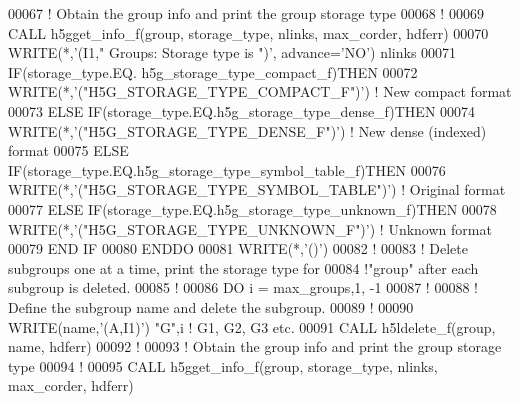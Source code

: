 \begin{DoxyCode}
00067      \textcolor{comment}{! Obtain the group info and print the group storage type}
00068      \textcolor{comment}{!}
00069      \textcolor{keyword}{CALL }h5gget\_info\_f(group, storage\_type, nlinks, max\_corder, hdferr)
00070      \textcolor{keyword}{WRITE}(*,\textcolor{stringliteral}{'(I1," Groups: Storage type is ")'}, advance=\textcolor{stringliteral}{'NO'}) nlinks
00071      \textcolor{keywordflow}{IF}(storage\_type.EQ. h5g\_storage\_type\_compact\_f)\textcolor{keywordflow}{THEN}
00072         \textcolor{keyword}{WRITE}(*,\textcolor{stringliteral}{'("H5G\_STORAGE\_TYPE\_COMPACT\_F")'})  \textcolor{comment}{! New compact format}
00073      \textcolor{keywordflow}{ELSE} \textcolor{keywordflow}{IF}(storage\_type.EQ.h5g\_storage\_type\_dense\_f)\textcolor{keywordflow}{THEN}
00074         \textcolor{keyword}{WRITE}(*,\textcolor{stringliteral}{'("H5G\_STORAGE\_TYPE\_DENSE\_F")'}) \textcolor{comment}{! New dense (indexed) format}
00075      \textcolor{keywordflow}{ELSE} \textcolor{keywordflow}{IF}(storage\_type.EQ.h5g\_storage\_type\_symbol\_table\_f)\textcolor{keywordflow}{THEN}
00076         \textcolor{keyword}{WRITE}(*,\textcolor{stringliteral}{'("H5G\_STORAGE\_TYPE\_SYMBOL\_TABLE")'}) \textcolor{comment}{! Original format}
00077      \textcolor{keywordflow}{ELSE} \textcolor{keywordflow}{IF}(storage\_type.EQ.h5g\_storage\_type\_unknown\_f)\textcolor{keywordflow}{THEN}
00078         \textcolor{keyword}{WRITE}(*,\textcolor{stringliteral}{'("H5G\_STORAGE\_TYPE\_UNKNOWN\_F")'}) \textcolor{comment}{! Unknown format}
00079 \textcolor{keywordflow}{     END IF}
00080 \textcolor{keywordflow}{  ENDDO}
00081   \textcolor{keyword}{WRITE}(*,\textcolor{stringliteral}{'()'})
00082   \textcolor{comment}{!}
00083   \textcolor{comment}{! Delete subgroups one at a time, print the storage type for}
00084   \textcolor{comment}{!"group" after each subgroup is deleted.}
00085   \textcolor{comment}{!}
00086   \textcolor{keywordflow}{DO} i = max\_groups,1, -1
00087      \textcolor{comment}{!}
00088      \textcolor{comment}{! Define the subgroup name and delete the subgroup.}
00089      \textcolor{comment}{!}
00090      \textcolor{keyword}{WRITE}(name,\textcolor{stringliteral}{'(A,I1)'}) \textcolor{stringliteral}{"G"},i \textcolor{comment}{! G1, G2, G3 etc.}
00091      \textcolor{keyword}{CALL }h5ldelete\_f(group, name, hdferr)
00092      \textcolor{comment}{!}
00093      \textcolor{comment}{! Obtain the group info and print the group storage type}
00094      \textcolor{comment}{!}
00095      \textcolor{keyword}{CALL }h5gget\_info\_f(group, storage\_type, nlinks, max\_corder, hdferr)

\end{DoxyCode}
